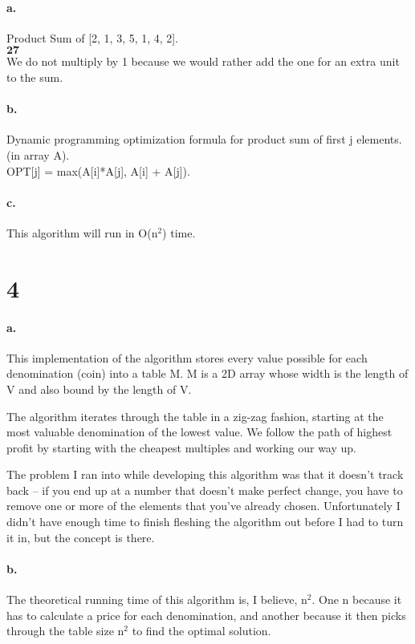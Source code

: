 \documentclass[10pt,a4paper]{report}
\begin{document}
	\paragraph*{a.} Product Sum of [2, 1, 3, 5, 1, 4, 2].
	\\
	
	$\boldsymbol{27}$
	\\
	
	We do not multiply by 1 because we would rather add the one for an extra unit to the sum.
	
	\paragraph*{b.} Dynamic programming optimization formula for product sum of first j elements. (in array A).
	\\
	OPT[j] = max(A[i]*A[j], A[i] + A[j]).
	
	\paragraph*{c.} This algorithm will run in O(n$^2$) time.
	
	\newpage
	\section*{4}
	\paragraph*{a.}
	This implementation of the algorithm stores every value possible for each denomination (coin) into a table M. M is a 2D array whose width is the length of V and also bound by the length of V.
	
	The algorithm iterates through the table in a zig-zag fashion, starting at the most valuable denomination of the lowest value. We follow the path of highest profit by starting with the cheapest multiples and working our way up.
	
	The problem I ran into while developing this algorithm was that it doesn't track back -- if you end up at a number that doesn't make perfect change, you have to remove one or more of the elements that you've already chosen. Unfortunately I didn't have enough time to finish fleshing the algorithm out before I had to turn it in, but the concept is there.
	
	
	\paragraph*{b.}
	The theoretical running time of this algorithm is, I believe, n$^2$. One n because it has to calculate a price for each denomination, and another because it then picks through the table size n$^2$ to find the optimal solution.
	
	
	
	
	\begin{lstlisting}[tabsize=4]

	
	
	
	\end{lstlisting}

	
	
	

	

	
\end{document}
